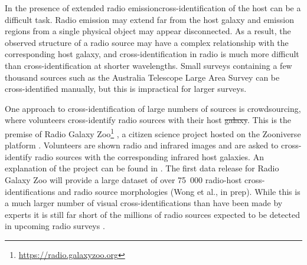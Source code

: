 \documentclass[11pt, a4paper]{book}
\providecommand{\DIFaddtex}[1]{{\protect\color{blue}\uwave{#1}}} %
\providecommand{\DIFdeltex}[1]{{\protect\color{red}\sout{#1}}}                      %
\providecommand{\DIFaddbegin}{} %
\providecommand{\DIFaddend}{} %
\providecommand{\DIFdelbegin}{} %
\providecommand{\DIFdelend}{} %
\providecommand{\DIFadd}[1]{\texorpdfstring{\DIFaddtex{#1}}{#1}} %
\providecommand{\DIFdel}[1]{\texorpdfstring{\DIFdeltex{#1}}{}} %
\newcommand{\DIFscaledelfig}{0.5}
\newlength{\DIFdelgraphicswidth} %
\newlength{\DIFdelgraphicsheight} %
\newcommand{\DIFaddincludegraphics}[2][]{{\color{blue}\fbox{\DIFOincludegraphics[#1]{#2}}}} %
\newcommand{\DIFdelincludegraphics}[2][]{%
\sbox{\DIFdelgraphicsbox}{\DIFOincludegraphics[#1]{#2}}%
\settoboxwidth{\DIFdelgraphicswidth}{\DIFdelgraphicsbox} %
\settoboxtotalheight{\DIFdelgraphicsheight}{\DIFdelgraphicsbox} %
\scalebox{\DIFscaledelfig}{%
\parbox[b]{\DIFdelgraphicswidth}{\usebox{\DIFdelgraphicsbox}\\[-\baselineskip] \rule{\DIFdelgraphicswidth}{0em}}\llap{\resizebox{\DIFdelgraphicswidth}{\DIFdelgraphicsheight}{%
\setlength{\unitlength}{\DIFdelgraphicswidth}%
\begin{picture}(1,1)%
\thicklines\linethickness{2pt} %
{\color[rgb]{1,0,0}\put(0,0){\framebox(1,1){}}}%
{\color[rgb]{1,0,0}\put(0,0){\line( 1,1){1}}}%
{\color[rgb]{1,0,0}\put(0,1){\line(1,-1){1}}}%
\end{picture}%
}\hspace*{3pt}}} %
} %
\DeclareRobustCommand{\DIFaddbegin}{\DIFOaddbegin \let\includegraphics\DIFaddincludegraphics} %
\DeclareRobustCommand{\DIFaddend}{\DIFOaddend \let\includegraphics\DIFOincludegraphics} %
\DeclareRobustCommand{\DIFdelbegin}{\DIFOdelbegin \let\includegraphics\DIFdelincludegraphics} %
\DeclareRobustCommand{\DIFdelend}{\DIFOaddend \let\includegraphics\DIFOincludegraphics} %
\begin{document}
    In the presence of extended radio emission\DIFaddbegin \DIFadd{, }\DIFaddend cross-identification of the host can be a
    difficult task. {Radio emission may extend far from the host galaxy
    and emission regions from a single physical object may appear disconnected. As a result, the
    observed structure of a radio source may have a complex relationship
    with the corresponding host galaxy, and cross-identification in radio is
    much more difficult than cross-identification at shorter wavelengths.} Small surveys
    containing a few thousand sources such as the Australia Telescope Large Area Survey
    \citep[ATLAS;][]{norris06, middelberg08} can be cross-identified manually,
    but this is impractical for larger surveys.

    One approach to cross-identification of large numbers of sources is crowdsourcing, where volunteers
    cross-identify radio sources with their host \DIFdelbegin \DIFdel{galaxy}\DIFdelend \DIFaddbegin \DIFadd{galaxies}\DIFaddend . This is the premise of Radio Galaxy
    Zoo\footnote{\url{https://radio.galaxyzoo.org}} \citep{banfield15}, a
    citizen science project hosted on the Zooniverse platform \citep{lintott08}.
    Volunteers are shown radio and infrared images and are asked to
    cross-identify radio sources with the corresponding infrared host galaxies. An
    explanation of the project can be found in \citet{banfield15}. The first
    data release for Radio Galaxy Zoo will provide a large dataset of over
    75~000 radio-host cross-identifications and radio source morphologies
    (Wong et al., in prep\DIFaddbegin \DIFadd{.}\DIFaddend ). While this is a much larger number of visual
    cross-identifications than have been made by experts \citep[e.g.,
    ][]{taylor2007,Gendre2008,grant2010,norris06,middelberg08} it is still far
    short of the millions of radio sources expected to be detected in upcoming
    radio surveys \citep{norris17surveys}.
\end{document}
